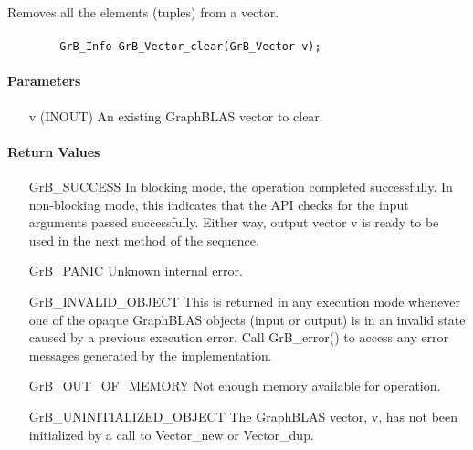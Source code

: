 Removes all the elements (tuples) from a vector.

\paragraph{\syntax}

\begin{verbatim}
        GrB_Info GrB_Vector_clear(GrB_Vector v);
\end{verbatim}

\paragraph{Parameters}

\begin{itemize}[leftmargin=1.1in]
    \item[{\sf v}] ({\sf INOUT}) An existing GraphBLAS vector to clear.
\end{itemize}

\paragraph{Return Values}

\begin{itemize}[leftmargin=2.1in]
    \item[{\sf GrB\_SUCCESS}]         In blocking mode, the operation completed
    successfully. In non-blocking mode, this indicates that the API checks 
    for the input arguments passed successfully. Either way, output vector 
    {\sf v} is ready to be used in the next method of the sequence.

    \item[{\sf GrB\_PANIC}]           Unknown internal error.
    
    \item[{\sf GrB\_INVALID\_OBJECT}] This is returned in any execution mode 
    whenever one of the opaque GraphBLAS objects (input or output) is in an invalid 
    state caused by a previous execution error.  Call {\sf GrB\_error()} to access 
    any error messages generated by the implementation.

    \item[{\sf GrB\_OUT\_OF\_MEMORY}] Not enough memory available for operation.
    
    \item[{\sf GrB\_UNINITIALIZED\_OBJECT}]  The GraphBLAS vector, {\sf v}, has 
    not been initialized by a call to {\sf Vector\_new} or {\sf Vector\_dup}.
    
\end{itemize}

